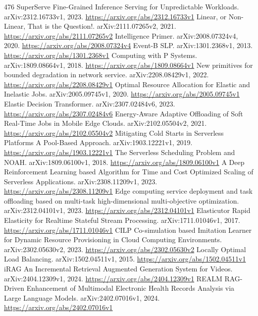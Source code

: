 \documentclass[11pt]{article}
\begin{document}
\begin{thebibliography}{476}
 SuperServe Fine-Grained Inference Serving for Unpredictable Workloads. arXiv:2312.16733v1, 2023. \url{https://arxiv.org/abs/2312.16733v1}
 Linear, or Non-Linear, That is the Question!. arXiv:2111.07265v2, 2021. \url{https://arxiv.org/abs/2111.07265v2}
 Intelligence Primer. arXiv:2008.07324v4, 2020. \url{https://arxiv.org/abs/2008.07324v4}
 Event-B SLP. arXiv:1301.2368v1, 2013. \url{https://arxiv.org/abs/1301.2368v1}
 Computing with P Systems. arXiv:1809.08664v1, 2018. \url{https://arxiv.org/abs/1809.08664v1}
 New primitives for bounded degradation in network service. arXiv:2208.08429v1, 2022. \url{https://arxiv.org/abs/2208.08429v1}
 Optimal Resource Allocation for Elastic and Inelastic Jobs. arXiv:2005.09745v1, 2020. \url{https://arxiv.org/abs/2005.09745v1}
 Elastic Decision Transformer. arXiv:2307.02484v6, 2023. \url{https://arxiv.org/abs/2307.02484v6}
 Energy-Aware Adaptive Offloading of Soft Real-Time Jobs in Mobile Edge Clouds. arXiv:2102.05504v2, 2021. \url{https://arxiv.org/abs/2102.05504v2}
 Mitigating Cold Starts in Serverless Platforms A Pool-Based Approach. arXiv:1903.12221v1, 2019. \url{https://arxiv.org/abs/1903.12221v1}
 The Serverless Scheduling Problem and NOAH. arXiv:1809.06100v1, 2018. \url{https://arxiv.org/abs/1809.06100v1}
 A Deep Reinforcement Learning based Algorithm for Time and Cost Optimized Scaling of Serverless Applications. arXiv:2308.11209v1, 2023. \url{https://arxiv.org/abs/2308.11209v1}
 Edge computing service deployment and task offloading based on multi-task high-dimensional multi-objective optimization. arXiv:2312.04101v1, 2023. \url{https://arxiv.org/abs/2312.04101v1}
 Elasticutor Rapid Elasticity for Realtime Stateful Stream Processing. arXiv:1711.01046v1, 2017. \url{https://arxiv.org/abs/1711.01046v1}
 CILP Co-simulation based Imitation Learner for Dynamic Resource Provisioning in Cloud Computing Environments. arXiv:2302.05630v2, 2023. \url{https://arxiv.org/abs/2302.05630v2}
 Locally Optimal Load Balancing. arXiv:1502.04511v1, 2015. \url{https://arxiv.org/abs/1502.04511v1}
 iRAG An Incremental Retrieval Augmented Generation System for Videos. arXiv:2404.12309v1, 2024. \url{https://arxiv.org/abs/2404.12309v1}
 REALM RAG-Driven Enhancement of Multimodal Electronic Health Records Analysis via Large Language Models. arXiv:2402.07016v1, 2024. \url{https://arxiv.org/abs/2402.07016v1}

\end{thebibliography}
\end{document}
